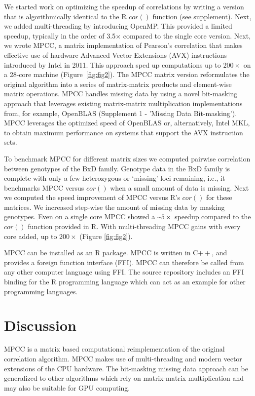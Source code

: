 \documentclass{bioinfo}
\begin{document}
We started work on optimizing the speedup of correlations by writing a
version that is algorithmically identical to the R $cor()$ function
(see supplement). Next, we added multi-threading by introducing
OpenMP. This provided a limited speedup, typically in the order of
3.5$\times$ compared to the single core version.  Next, we wrote MPCC,
a matrix implementation of Pearson's correlation that makes effective
use of hardware Advanced Vector Extensions (AVX) instructions
introduced by Intel in 2011. This approach sped up computations up to
$200\times$ on a 28-core machine (Figure~\ref{fig:fig2}).  The MPCC
matrix version reformulates the original algorithm into a series of
matrix-matrix products and element-wise matrix operations. MPCC
handles missing data by using a novel bit-masking approach that
leverages existing matrix-matrix multiplication implementations from,
for example, OpenBLAS (Supplement 1 - 'Missing Data Bit-masking').
MPCC leverages the optimized speed of OpenBLAS or, alternatively,
Intel\textregistered{} MKL, to obtain maximum performance on systems
that support the AVX instruction sets.

To benchmark MPCC for different matrix sizes we computed pairwise
correlation between genotypes of the BxD family.  Genotype data in the
BxD family is complete with only a few heterozygous or `missing' loci
remaining, i.e., it benchmarks MPCC versus $cor()$ when a small amount
of data is missing.  Next we computed the speed improvement of MPCC
versus R's $cor()$ for these matrices. We increased step-wise the
amount of missing data by masking genotypes. Even on a single core
MPCC showed a
\textasciitilde{}$5\times$ speedup compared to the $cor()$
function provided in R. With multi-threading MPCC
gains with every core added, up to $200\times$ (Figure \ref{fig:fig2}).

MPCC can be installed as an R package. MPCC is written in C$++$, and
provides a foreign function interface (FFI). MPCC can therefore be
called from any other computer language using FFI. The source
repository includes an FFI binding for the R programming language
which can act as an example for other programming languages.

\vspace*{2mm}
\section{Discussion}

MPCC is a matrix based computational reimplementation of the original
correlation algorithm. MPCC makes use of multi-threading and modern
vector extensions of the CPU hardware.  The bit-masking missing data
approach can be generalized to other algorithms which rely on
matrix-matrix multiplication and may also be suitable for GPU
computing.
\end{document}
